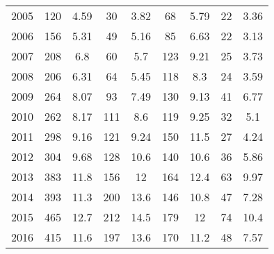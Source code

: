 \begin{table}[htbp]
\begin{tabular}{l*{8}{c}}
2005      &      120&     4.59&       30&     3.82&       68&     5.79&       22&     3.36\\
2006      &      156&     5.31&       49&     5.16&       85&     6.63&       22&     3.13\\
2007      &      208&      6.8&       60&      5.7&      123&     9.21&       25&     3.73\\
2008      &      206&     6.31&       64&     5.45&      118&      8.3&       24&     3.59\\
2009      &      264&     8.07&       93&     7.49&      130&     9.13&       41&     6.77\\
2010      &      262&     8.17&      111&      8.6&      119&     9.25&       32&      5.1\\
2011      &      298&     9.16&      121&     9.24&      150&     11.5&       27&     4.24\\
2012      &      304&     9.68&      128&     10.6&      140&     10.6&       36&     5.86\\
2013      &      383&     11.8&      156&       12&      164&     12.4&       63&     9.97\\
2014      &      393&     11.3&      200&     13.6&      146&     10.8&       47&     7.28\\
2015      &      465&     12.7&      212&     14.5&      179&       12&       74&     10.4\\
2016      &      415&     11.6&      197&     13.6&      170&     11.2&       48&     7.57\\
\hline\hline
\end{tabular}
\end{table}
